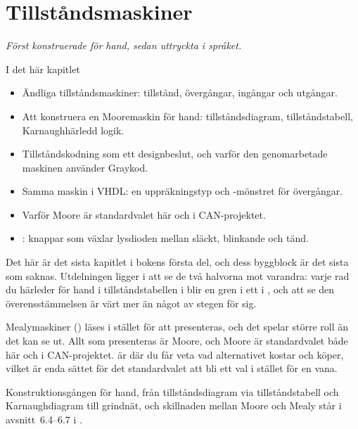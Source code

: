 
\chapter{Tillståndsmaskiner}
\label{c8:ch}

{\large\itshape Först konstruerade för hand, sedan uttryckta i språket.\par}

\begin{chapterbox}{I det här kapitlet}
\begin{itemize}
  \item Ändliga tillståndsmaskiner: tillstånd, övergångar, ingångar och utgångar.
  \item Att konstruera en Mooremaskin för hand: tillståndsdiagram, tillståndstabell,
    Karnaughhärledd logik.
  \item Tillståndskodning som ett designbeslut, och varför den genomarbetade maskinen använder
    Graykod.
  \item Samma maskin i VHDL: en uppräkningstyp och -mönstret för övergångar.
  \item Varför Moore är standardvalet här och i CAN-projektet.
  \item {}: knappar som växlar lysdioden mellan släckt, blinkande och tänd.
\end{itemize}
\end{chapterbox}

Det här är det sista kapitlet i bokens första del, och dess byggblock är det sista som saknas.
Utdelningen ligger i att se de två halvorna mot varandra: varje rad du härleder för hand i
tillståndstabellen i  blir en gren i ett  i ,
och att se den överensstämmelsen är värt mer än något av stegen för sig.

Mealymaskiner () läses i stället för att presenteras, och det spelar större
roll än det kan se ut. Allt som presenteras är Moore, och Moore är standardvalet både här och i
CAN-projektet.  är där du får veta vad alternativet kostar och köper, vilket är
enda sättet för det standardvalet att bli ett val i stället för en vana.

\note[Repetition] Konstruktionsgången för hand, från tillståndsdiagram via tillståndstabell och
Karnaughdiagram till grindnät, och skillnaden mellan Moore och Mealy står i avsnitt~6.4--6.7 i
\debook{}.




